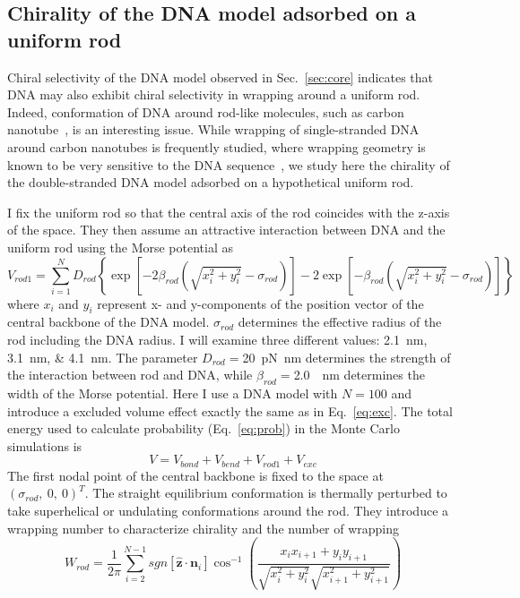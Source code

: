 \documentclass[a4paper,10pt]{article}
\begin{document}
\subsection{Chirality of the DNA model adsorbed on a uniform rod}
Chiral selectivity of the DNA model observed in Sec.~\ref{sec:core} indicates that DNA may also exhibit chiral selectivity in wrapping around a uniform rod.
Indeed, conformation of DNA around rod-like molecules, such as carbon nanotube~\cite{rod_2}, is an interesting issue.
While wrapping of single-stranded DNA around carbon nanotubes is frequently studied, where wrapping geometry is known to be very sensitive to the DNA sequence~\cite{rod_1}, we study here the chirality of the double-stranded DNA model adsorbed on a hypothetical uniform rod.

I fix the uniform rod so that the central axis of the rod coincides with the z-axis of the space.
They then assume an attractive interaction between DNA and the uniform rod using the Morse potential as
\begin{equation}\label{eq:rod_1}
V_{rod 1}=\sum_{i=1}^{N}D_{rod}\left\{\exp\left[-2\beta_{rod}\left(\sqrt{x_{i}^{2}+y_{i}^{2}}-\sigma_{rod}\right)\right]-2\exp\left[-\beta_{rod}\left(\sqrt{x_{i}^{2}+y_{i}^{2}}-\sigma_{rod}\right)\right]\right\}
\end{equation}
where $x_{i}$ and $y_{i}$ represent x- and y-components of the position vector of the central backbone of the DNA model.
$\sigma_{rod}$ determines the effective radius of the rod including the DNA radius.
I will examine three different values: \SIlist{2.1;3.1;4.1}{\nm}.
The parameter $D_{rod}=$\SI{20}{\pico\newton\nano\meter} determines the strength of the interaction between rod and DNA, while $\beta_{rod}=$\SI{2.0}{\per\nm} determines the width of the Morse potential.
Here I use a DNA model with $N=100$ and introduce a excluded volume effect exactly the same as in Eq.~\ref{eq:exc}.
The total energy used to calculate probability (Eq.~\ref{eq:prob}) in the Monte Carlo simulations is
\begin{equation}\label{eq:rod_1_energy}
V=V_{bond}+V_{bend}+V_{rod 1}+V_{exc}
\end{equation}
The first nodal point of the central backbone is fixed to the space at $\left(\sigma_{rod},\ 0,\ 0\right )^T$.
The straight equilibrium conformation is thermally perturbed to take superhelical or undulating conformations around the rod.
They introduce a wrapping number to characterize chirality and the number of wrapping
\begin{equation}\label{eq:wrap_rod}
W_{rod}=\dfrac{1}{2\pi}\sum_{i=2}^{N-1} sgn\left [\hat{\textbf{z}}\cdot\textbf{n}_{i}\right ]\cos^{-1}\left (\dfrac{x_{i}x_{i+1}+y_{i}y_{i+1}}{\sqrt{x_{i}^2+y_{i}^2}\sqrt{x_{i+1}^2+y_{i+1}^2}}\right )
\end{equation}
\end{document}

